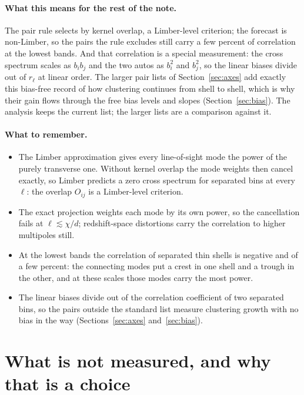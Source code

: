 \documentclass[11pt]{article}
\begin{document}
\paragraph{What this means for the rest of the note.}
The pair rule selects by kernel overlap, a Limber-level criterion;
the forecast is non-Limber, so the pairs the rule excludes still
carry a few percent of correlation at the lowest bands.  And that
correlation is a special measurement: the cross spectrum scales as
$b_i b_j$ and the two autos as $b_i^2$ and $b_j^2$, so the linear
biases divide out of $r_\ell$ at linear order.  The larger pair
lists of Section~\ref{sec:axes} add exactly this bias-free record
of how clustering continues from shell to shell, which is why their
gain flows through the free bias levels and slopes
(Section~\ref{sec:bias}).  The analysis keeps the current list; the
larger lists are a comparison against it.

\paragraph{What to remember.}
\begin{itemize}
  \item The Limber approximation gives every line-of-sight mode the
    power of the purely transverse one.  Without kernel overlap the
    mode weights then cancel exactly, so Limber predicts a zero
    cross spectrum for separated bins at every $\ell$: the overlap
    $O_{ij}$ is a Limber-level criterion.
  \item The exact projection weights each mode by its own power, so
    the cancellation fails at $\ell \lesssim \chi/d$; redshift-space
    distortions carry the correlation to higher multipoles still.
  \item At the lowest bands the correlation of separated thin
    shells is negative and of a few percent: the connecting modes
    put a crest in one shell and a trough in the other, and at
    these scales those modes carry the most power.
  \item The linear biases divide out of the correlation coefficient
    of two separated bins, so the pairs outside the standard list
    measure clustering growth with no bias in the way
    (Sections~\ref{sec:axes} and~\ref{sec:bias}).
\end{itemize}

\section{What is not measured, and why that is a choice}
\label{sec:notmeasured}
\end{document}
